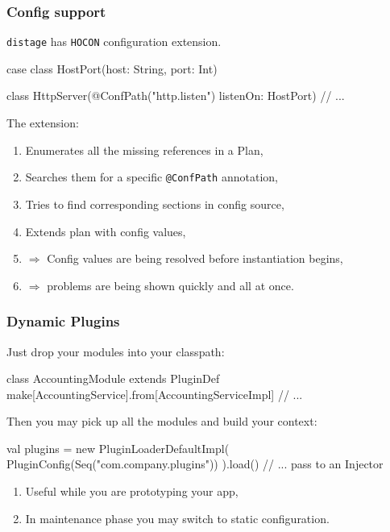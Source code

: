 \documentclass[usenames,dvipsnames]{beamer}
\newcommand{\distage}{\texttt{distage}\xspace}
\begin{document}
\begin{frame}[fragile]
\frametitle{Config support}
  \distage has \texttt{HOCON} configuration extension.

  \begin{scalacode}
case class HostPort(host: String, port: Int)

class HttpServer(@ConfPath("http.listen") listenOn: HostPort) {
  // ...
}
  \end{scalacode}

  The extension:
  \begin{enumerate}
  \item Enumerates all the missing references in a Plan,
  \item Searches them for a specific \texttt{@ConfPath} annotation,
  \item Tries to find corresponding sections in config source,
  \item Extends plan with config values,
  \item $\Rightarrow$ Config values are being resolved before instantiation begins,
  \item $\Rightarrow$ problems are being shown quickly and all at once.
  \end{enumerate}
\end{frame}

\begin{frame}[fragile]
  \frametitle{Dynamic Plugins}
  Just drop your modules into your classpath:
  \begin{scalacode}
class AccountingModule extends PluginDef {
  make[AccountingService].from[AccountingServiceImpl]
  // ...
}
  \end{scalacode}
  Then you may pick up all the modules and build your context:
  \begin{scalacode}
val plugins = new PluginLoaderDefaultImpl(
  PluginConfig(Seq("com.company.plugins"))
).load()
// ... pass to an Injector
  \end{scalacode}
  \begin{enumerate}
  \item Useful while you are prototyping your app,
  \item In maintenance phase you may switch to static configuration.
  \end{enumerate}
\end{frame}
\end{document}
